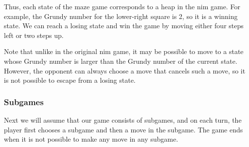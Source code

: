 \begin{center}
\end{center}

Thus, each state of the maze game
corresponds to a heap in the nim game.
For example, the Grundy number for
the lower-right square is 2,
so it is a winning state.
We can reach a losing state and
win the game by moving
either four steps left or
two steps up.

Note that unlike in the original nim game,
it may be possible to move to a state whose
Grundy number is larger than the Grundy number
of the current state.
However, the opponent can always choose a move
that cancels such a move, so it is not possible
to escape from a losing state.

\subsubsection{Subgames}

Next we will assume that our game consists
of subgames, and on each turn, the player
first chooses a subgame and then a move in the subgame.
The game ends when it is not possible to make any move
in any subgame.

